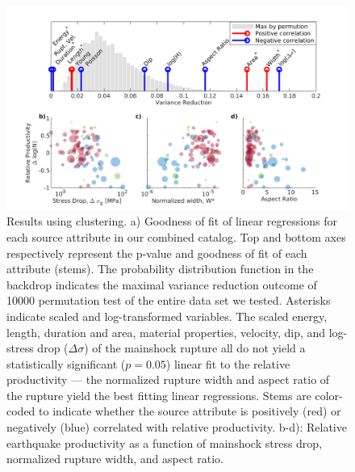 \documentclass[draft]{agujournal}
\begin{document}
\begin{figure}[H]
    \centering
        \includegraphics[width = 0.8\linewidth]{figures/stem_plot_z2008.png}
    
    \caption{Results using \citet{Zaliapin2008} clustering. a) Goodness of fit of linear regressions for each source attribute in our combined catalog. Top and bottom axes respectively represent the p-value and goodness of fit of each attribute (stems). The probability distribution function in the backdrop indicates the maximal variance reduction outcome of 10000 permutation test of the entire data set we tested. Asterisks indicate scaled and log-transformed variables. The scaled energy, length, duration and area, material properties, velocity, dip, and log-stress drop ($\Delta\sigma$) of the mainshock rupture all do not yield a statistically significant ($p=0.05$) linear fit to the relative productivity — the normalized rupture width and aspect ratio of the rupture yield the best fitting linear regressions. Stems are color-coded to indicate whether the source attribute is positively (red) or negatively (blue) correlated with relative productivity. b-d): Relative earthquake productivity as a function of mainshock stress drop, normalized rupture width, and aspect ratio.}
        \label{fig:r2_finite_fault_z2008}
\end{figure}

\end{document}
